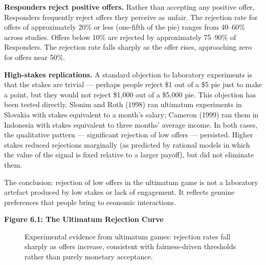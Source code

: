 \documentclass[12pt, letterpaper]{article}
\begin{document}
\textbf{Responders reject positive offers.} Rather than accepting any positive offer, Responders frequently reject offers they perceive as unfair. The rejection rate for offers of approximately 20\% or less (one-fifth of the pie) ranges from 40--60\% across studies. Offers below 10\% are rejected by approximately 75--90\% of Responders. The rejection rate falls sharply as the offer rises, approaching zero for offers near 50\%.

\textbf{High-stakes replications.} A standard objection to laboratory experiments is that the stakes are trivial --- perhaps people reject \$1 out of a \$5 pie just to make a point, but they would not reject \$1,000 out of a \$5,000 pie. This objection has been tested directly. Slonim and Roth (1998) ran ultimatum experiments in Slovakia with stakes equivalent to a month's salary; Cameron (1999) ran them in Indonesia with stakes equivalent to three months' average income. In both cases, the qualitative pattern --- significant rejection of low offers --- persisted. Higher stakes reduced rejections marginally (as predicted by rational models in which the value of the signal is fixed relative to a larger payoff), but did not eliminate them.

The conclusion: rejection of low offers in the ultimatum game is not a laboratory artefact produced by low stakes or lack of engagement. It reflects genuine preferences that people bring to economic interactions.

\newpage
\textbf{Figure 6.1: The Ultimatum Rejection Curve}

\begin{figure}[h!]
\centering


\caption{Experimental evidence from ultimatum games: rejection rates fall sharply as offers increase, consistent with fairness-driven thresholds rather than purely monetary acceptance.}
\end{figure}
\end{document}
